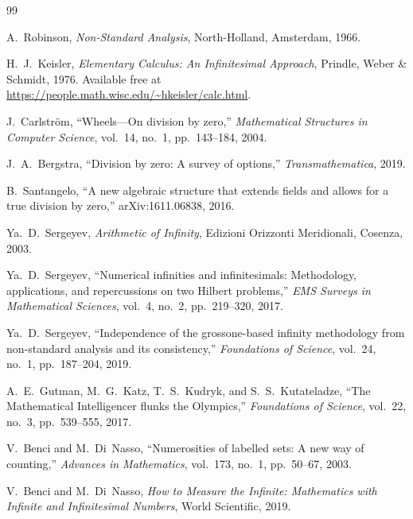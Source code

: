 \documentclass[12pt]{article}
\theoremstyle{definition}
\theoremstyle{remark}
\begin{document}
\begin{thebibliography}{99}


A.~Robinson, \emph{Non-Standard Analysis}, North-Holland, Amsterdam, 1966.

H.~J.~Keisler, \emph{Elementary Calculus: An Infinitesimal Approach},
Prindle, Weber \& Schmidt, 1976.
Available free at \url{https://people.math.wisc.edu/~hkeisler/calc.html}.

J.~Carlstr\"om, ``Wheels---On division by zero,''
\emph{Mathematical Structures in Computer Science}, vol.~14, no.~1,
pp.~143--184, 2004.

J.~A.~Bergstra, ``Division by zero: A survey of options,''
\emph{Transmathematica}, 2019.


B.~Santangelo, ``A new algebraic structure that extends fields and allows
for a true division by zero,'' arXiv:1611.06838, 2016.


Ya.~D.~Sergeyev, \emph{Arithmetic of Infinity}, Edizioni Orizzonti
Meridionali, Cosenza, 2003.

Ya.~D.~Sergeyev, ``Numerical infinities and infinitesimals: Methodology,
applications, and repercussions on two Hilbert problems,''
\emph{EMS Surveys in Mathematical Sciences}, vol.~4, no.~2, pp.~219--320, 2017.

Ya.~D.~Sergeyev, ``Independence of the grossone-based infinity methodology
from non-standard analysis and its consistency,''
\emph{Foundations of Science}, vol.~24, no.~1, pp.~187--204, 2019.

A.~E.~Gutman, M.~G.~Katz, T.~S.~Kudryk, and S.~S.~Kutateladze,
``The Mathematical Intelligencer flunks the Olympics,''
\emph{Foundations of Science}, vol.~22, no.~3, pp.~539--555, 2017.


V.~Benci and M.~Di~Nasso, ``Numerosities of labelled sets: A new way of
counting,'' \emph{Advances in Mathematics}, vol.~173, no.~1, pp.~50--67, 2003.

V.~Benci and M.~Di~Nasso, \emph{How to Measure the Infinite: Mathematics
with Infinite and Infinitesimal Numbers}, World Scientific, 2019.


\end{thebibliography}
\end{document}
